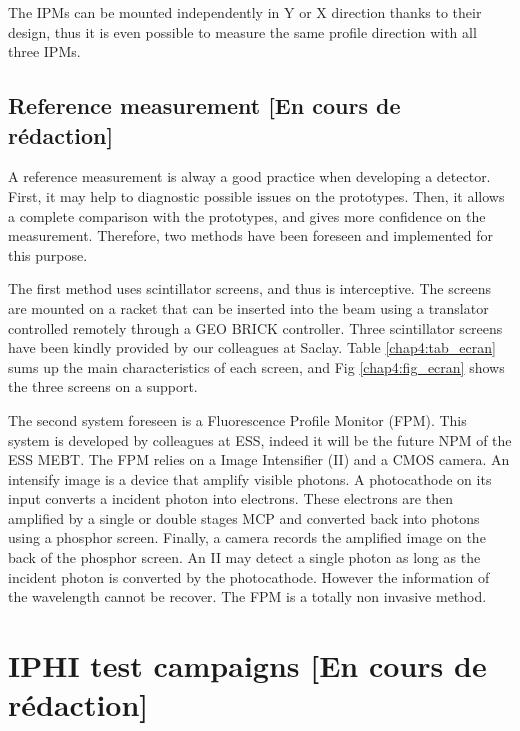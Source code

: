 \begin{refsection}
  The IPMs can be mounted independently in Y or X direction thanks to their design, thus it is even possible to measure the same profile direction with all three IPMs.

  


  \subsection{Reference measurement [En cours de rédaction]}
  A reference measurement is alway a good practice when developing a detector. First, it may help to diagnostic possible issues on the prototypes. Then, it allows a complete comparison with the prototypes, and gives more confidence on the measurement. Therefore, two methods have been foreseen and implemented for this purpose.

  The first method uses scintillator screens, and thus is interceptive. The screens are mounted on a racket that can be inserted into the beam using a translator controlled remotely through a GEO BRICK controller. Three scintillator screens have been kindly provided by our colleagues at Saclay. Table \ref{chap4:tab_ecran} sums up the main characteristics of each screen, and Fig \ref{chap4:fig_ecran} shows the three screens on a support.

  The second system foreseen is a Fluorescence Profile Monitor (FPM). This system is developed by colleagues at ESS, indeed it will be the future NPM of the ESS MEBT. The FPM relies on a Image Intensifier (II) and a CMOS camera. An intensify image is a device that amplify visible photons. A photocathode on its input converts a incident photon into electrons. These electrons are then amplified by a single or double stages MCP and converted back into photons using a phosphor screen. Finally, a camera records the amplified image on the back of the phosphor screen. An II may detect a single photon as long as the incident photon is converted by the photocathode. However the information of the wavelength cannot be recover. The FPM is a totally non invasive method.


  
  

  \section{IPHI test campaigns [En cours de rédaction]}
  


\end{refsection}
